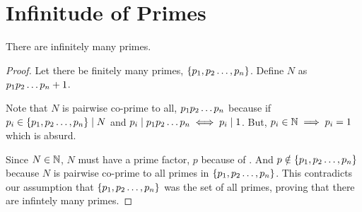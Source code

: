 \section{Infinitude of Primes}



\begin{theorem}
    [Euclid]
    There are infinitely many primes.
\end{theorem}

\begin{proof}
    Let there be finitely many primes, \(\{p_{1},p_{2}\ldots,p_{n}\}\). Define \( N \) as \( p_{1}p_{2}\ldots p_{n} + 1 \).
    \par
    Note that \(N\) is pairwise co-prime to all, \(p_{1}p_{2}\ldots p_{n}\) because if \(p_i \in \{p_{1},p_{2}\ldots,p_{n}\} \mid N \) and \(p_i \mid p_{1}p_{2}\ldots p_{n} \iff p_i \mid 1\). But, \( p_i \in \mathbb N \implies p_i = 1 \) which is absurd.
    \\
    \par Since \(N \in \mathbb N\), \(N\) must have a prime factor, \(p\) because of . And \(p \notin \{p_{1},p_{2}\ldots,p_{n}\}\) because \(N \) is pairwise co-prime to all primes in \(\{p_{1},p_{2}\ldots,p_{n}\}\). This contradicts our assumption that \(\{p_{1},p_{2}\ldots,p_{n}\}\) was the set of all primes, proving that there are infintely many primes.
    


\end{proof}





